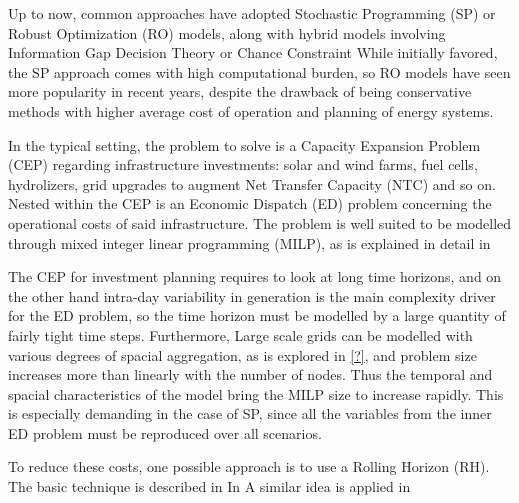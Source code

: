 Up to now, common approaches have adopted Stochastic Programming (SP) or Robust Optimization (RO) models, along with hybrid models involving Information Gap Decision Theory or Chance Constraint %
While initially favored, the SP approach comes with high computational burden, so RO models have seen more popularity in recent years, despite the drawback of being conservative methods with higher average cost of operation and planning of energy systems.

In the typical setting, the problem to solve is a Capacity Expansion Problem (CEP) regarding infrastructure investments: solar and wind farms, fuel cells, hydrolizers, grid upgrades to augment Net Transfer Capacity (NTC) and so on. 
Nested within the CEP is an Economic Dispatch (ED) problem concerning the operational costs of said infrastructure. 
The problem is well suited to be modelled through mixed integer linear programming (MILP), as is explained in detail in %

The CEP for investment planning requires to look at long time horizons, and on the other hand intra-day variability in generation is the main complexity driver for the ED problem, so the time horizon must be modelled by a large quantity of fairly tight time steps. 
Furthermore, Large scale grids can be modelled with various degrees of spacial aggregation, as is explored in \textcolor{green}{\href{https://ieeexplore.ieee.org/document/7982024}{[?]}}, and problem size increases more than linearly with the number of nodes.
Thus the temporal and spacial characteristics of the model bring the MILP size to increase rapidly. 
This is especially demanding in the case of SP, since all the variables from the inner ED problem must be reproduced over all scenarios.

To reduce these costs, one possible approach is to use a Rolling Horizon (RH). 
The basic technique is described in %
In %
A similar idea is applied in %

